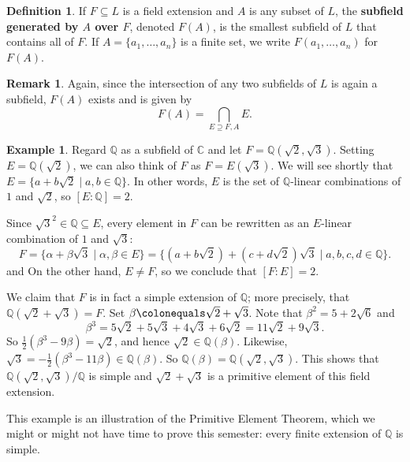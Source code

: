 \documentclass[12pt]{report}
\numberwithin{equation}{section}
\numberwithin{theorem}{chapter}
\theoremstyle{definition}
\newtheorem{definition}[theorem]{Definition}
\newtheorem{example}[theorem]{Example}
\newtheorem*{basic properties}{Basic Properties}
\newtheorem*{Important Remark}{Important Remark}
\newtheorem{remark}[theorem]{Remark}
\newcommand{\df}[1]{{\bf #1}\index{#1}}
\newcommand{\Q}{\mathbb{Q}}
\newcommand{\C}{\mathbb{C}}
\begin{document}
\begin{definition} 
If $F \subseteq L$ is a field extension and $A$ is any subset of $L$, the \df{subfield generated by $A$ over $F$}, denoted $F(A)$, is the smallest subfield of $L$ that contains all of $F$. If $A = \{a_1, \dots, a_n\}$ is a finite set, we write $F(a_1, \dots, a_n)$ for $F(A)$.
\end{definition}


\begin{remark}
Again, since the intersection of any two subfields of $L$ is again a subfield, $F(A)$ exists and is given by
$$F(A) = \bigcap_{E \supseteq F, A} E.$$
\end{remark}




\begin{example}\label{example sqrt 2 and 3}
Regard $\Q$ as a subfield of $\C$ and let $F = \Q(\sqrt{2}, \sqrt{3})$. Setting $E = \Q(\sqrt{2})$, we can also think of $F$ as $F = E(\sqrt{3})$.
We will see shortly that $E=\{a + b \sqrt{2} \mid a,b \in \Q\}$. In other words, $E$ is the set of $\Q$-linear combinations of $1$ and $\sqrt{2}$, so  $[E: \Q] = 2$.

Since $\sqrt{3}^2 \in \Q \subseteq E$, every element in $F$ can be rewritten as an $E$-linear combination of $1$ and $\sqrt{3}$:
$$F = \{ \alpha + \beta \sqrt{3} \mid \alpha, \beta \in E\} =\{(a + b \sqrt{2}) + (c + d \sqrt{2}) \sqrt{3} \mid a,b,c,d \in \Q\}.
$$ and %
On the other hand, $E \neq F$, so we conclude that $[F:E] = 2$. 

We claim that $F$ is in fact a simple extension of $\Q$; more precisely, that $\Q(\sqrt{2} + \sqrt{3}) = F$. Set $\beta \colonequals \sqrt{2} + \sqrt{3}$. Note that $\beta^2 = 5 + 2 \sqrt{6}$ and
$$\beta^3 = 5 \sqrt{2} + 5 \sqrt{3} + 4 \sqrt{3} + 6 \sqrt{2} = 11 \sqrt{2} + 9 \sqrt{3}.$$
So $\frac{1}{2}(\beta^3 - 9 \beta) = \sqrt{2}$, and hence $\sqrt{2} \in \Q(\beta)$. Likewise, $\sqrt{3} = -\frac{1}{2}(\beta^3 - 11 \beta) \in \Q(\beta)$. So $\Q(\beta) = \Q(\sqrt{2},\sqrt{3})$.
This shows that $\Q(\sqrt{2}, \sqrt{3})/\Q$ is simple and $\sqrt{2} + \sqrt{3}$ is a primitive element of this field extension.
\end{example}

This example is an illustration of the Primitive Element Theorem, which we might or might not have time to prove this semester: every finite extension of $\Q$ is simple. 
\end{document}
